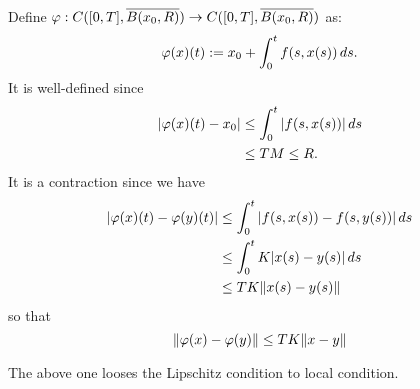 \documentclass[12pt]{article}
\begin{document}
\begin{pf}
Define $\varphi:C([0,T],\overline{B(x_0,R)})\to C([0,T],\overline{B(x_0,R)})$ as:
\[\varphi(x)(t):=x_0+\int_0^tf(s,x(s))\,ds.\]
It is well-defined since
\begin{align*}
|\varphi(x)(t)-x_0|&\le\int_0^t|f(s,x(s))|\,ds\\
&\le TM\le R.
\end{align*}
It is a contraction since we have
\begin{align*}
|\varphi(x)(t)-\varphi(y)(t)|
&\le\int_0^t|f(s,x(s))-f(s,y(s))|\,ds\\
&\le\int_0^tK|x(s)-y(s)|\,ds\\
&\le TK\|x(s)-y(s)\|
\end{align*}
so that
\[\|\varphi(x)-\varphi(y)\|\le TK\|x-y\|\]
\end{pf}
The above one looses the Lipschitz condition to local condition.
\end{document}
